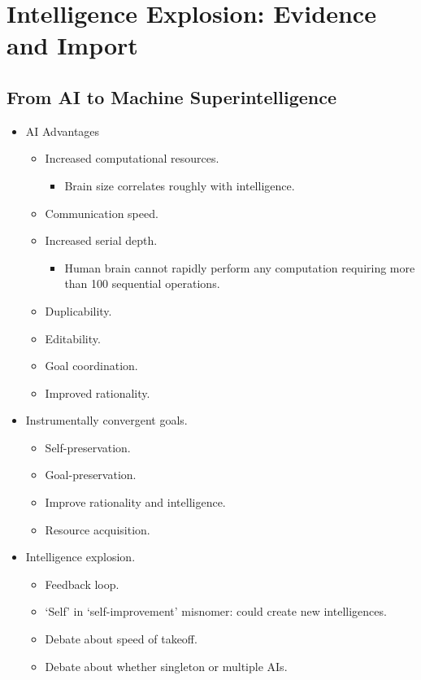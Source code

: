 \section{Intelligence Explosion: Evidence and Import}

\subsection{From AI to Machine Superintelligence}

\begin{itemize}
    \item AI Advantages
    \begin{itemize}
        \item Increased computational resources.
        \begin{itemize}
            \item Brain size correlates roughly with intelligence.
        \end{itemize}
        \item Communication speed.
        \item Increased serial depth.
        \begin{itemize}
            \item Human brain cannot rapidly perform any computation requiring more than 100 sequential operations.
        \end{itemize}
        \item Duplicability.
        \item Editability.
        \item Goal coordination.
        \item Improved rationality.
    \end{itemize}
    \item Instrumentally convergent goals.
    \begin{itemize}
        \item Self-preservation.
        \item Goal-preservation.
        \item Improve rationality and intelligence.
        \item Resource acquisition.
    \end{itemize}
    \item Intelligence explosion.
    \begin{itemize}
        \item Feedback loop.
        \item `Self' in `self-improvement' misnomer: could create new intelligences.
        \item Debate about speed of takeoff.
        \item Debate about whether singleton or multiple AIs.
    \end{itemize}
\end{itemize}


